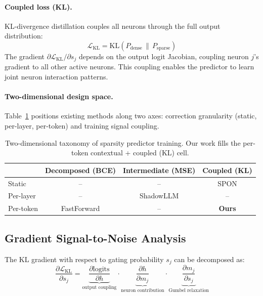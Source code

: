 \documentclass[11pt,a4paper]{article}
\begin{document}
\paragraph{Coupled loss (KL).} KL-divergence distillation couples all neurons through the full output distribution:
\begin{equation}
    \mathcal{L}_{\text{KL}} = \text{KL}\left( P_{\text{dense}} \,\|\, P_{\text{sparse}} \right)
\end{equation}
The gradient $\partial \mathcal{L}_{\text{KL}} / \partial s_j$ depends on the output logit Jacobian, coupling neuron $j$'s gradient to all other active neurons. This coupling enables the predictor to learn joint neuron interaction patterns.

\paragraph{Two-dimensional design space.} Table~\ref{tab:taxonomy} positions existing methods along two axes: correction granularity (static, per-layer, per-token) and training signal coupling.

\begin{table}[h]
\centering
\small
\begin{tabular}{lccc}
\toprule
 & Decomposed (BCE) & Intermediate (MSE) & Coupled (KL) \\
\midrule
Static & -- & -- & SPON \\
Per-layer & -- & ShadowLLM & -- \\
Per-token & FastForward & -- & \textbf{Ours} \\
\bottomrule
\end{tabular}
\caption{Two-dimensional taxonomy of sparsity predictor training. Our work fills the per-token contextual + coupled (KL) cell.}
\label{tab:taxonomy}
\end{table}

\subsection{Gradient Signal-to-Noise Analysis}

The KL gradient with respect to gating probability $s_j$ can be decomposed as:
\begin{equation}
    \frac{\partial \mathcal{L}_{\text{KL}}}{\partial s_j} = \underbrace{\frac{\partial \text{logits}}{\partial h}}_{\text{output coupling}} \cdot \underbrace{\frac{\partial h}{\partial m_j}}_{\text{neuron contribution}} \cdot \underbrace{\frac{\partial m_j}{\partial s_j}}_{\text{Gumbel relaxation}}
\end{equation}
\end{document}

